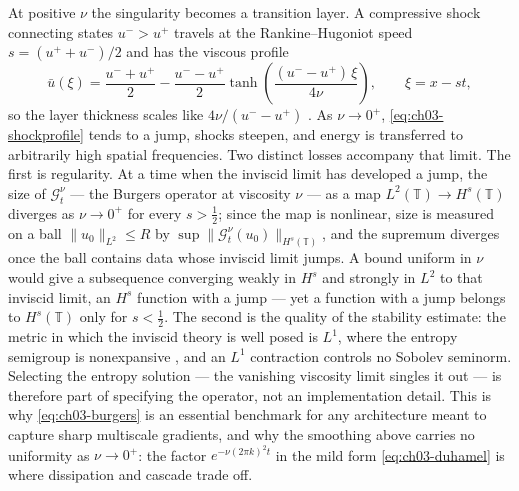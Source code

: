 At positive $\nu$ the singularity becomes a transition layer. A compressive
shock connecting states $u^- > u^+$ travels at the Rankine--Hugoniot speed
$s = (u^+ + u^-)/2$ and has the viscous profile
\begin{equation}
  \bar{u}(\xi) = \frac{u^- + u^+}{2} - \frac{u^- - u^+}{2}
  \tanh\!\left(\frac{(u^- - u^+)\,\xi}{4\nu}\right),
  \qquad \xi = x - s t,
  \label{eq:ch03-shockprofile}
\end{equation}
so the layer thickness scales like $4\nu/(u^- - u^+)$
\cite{leveque2002finite}. As $\nu \to 0^+$, \eqref{eq:ch03-shockprofile} tends to
a jump, shocks steepen, and energy is transferred to
arbitrarily high spatial frequencies. Two distinct losses accompany that limit.
The first is regularity. At a time when the inviscid limit has developed a
jump, the size of $\mathcal{G}_t^\nu$ --- the Burgers operator at viscosity
$\nu$ --- as a map
$L^2(\mathbb{T}) \to
H^s(\mathbb{T})$ diverges as $\nu \to 0^+$ for every $s > \tfrac{1}{2}$;
since the map is nonlinear, size is measured on a ball $\|u_0\|_{L^2} \le R$
by $\sup \|\mathcal{G}_t^\nu(u_0)\|_{H^s(\mathbb{T})}$, and the supremum diverges
once the ball contains data whose inviscid limit jumps. A bound uniform in $\nu$
would give a subsequence converging weakly in $H^s$ and strongly in $L^2$ to that
inviscid limit, an $H^s$ function with a jump --- yet a function with a jump
belongs to
$H^s(\mathbb{T})$ only for $s < \tfrac{1}{2}$. The second is the quality of the
stability estimate: the metric in which the inviscid theory is well posed is
$L^1$, where the entropy semigroup is nonexpansive \cite{leveque2002finite}, and
an $L^1$ contraction controls no Sobolev seminorm. Selecting the entropy solution
--- the vanishing viscosity limit singles it out --- is
therefore part of specifying the operator, not an
implementation detail. This is why \eqref{eq:ch03-burgers} is an essential
benchmark for any architecture meant to capture sharp multiscale gradients, and
why the smoothing above carries no uniformity
as $\nu \to 0^+$: the factor $e^{-\nu (2\pi k)^2 t}$ in the mild
form \eqref{eq:ch03-duhamel} is where dissipation and cascade trade off.

